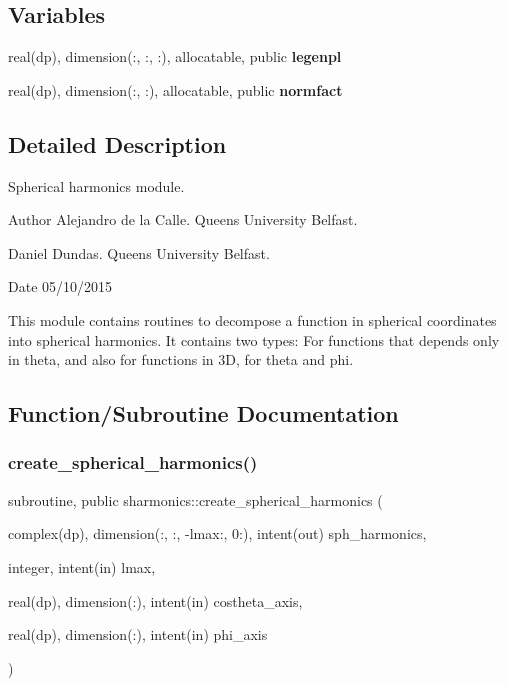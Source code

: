 \subsection*{Variables}
\begin{DoxyCompactItemize}
\item 
\mbox{\label{namespacesharmonics_a54e2870724fae4c7a6ac8dc4b971a993}} 
real(dp), dimension(\+:, \+:, \+:), allocatable, public {\bfseries legenpl}
\item 
\mbox{\label{namespacesharmonics_a9cfef04ded9db9a5fd116ec10af39b43}} 
real(dp), dimension(\+:, \+:), allocatable, public {\bfseries normfact}
\end{DoxyCompactItemize}


\subsection{Detailed Description}
Spherical harmonics module. 

\begin{DoxyAuthor}{Author}
Alejandro de la Calle. Queen\textquotesingle{}s University Belfast. 

Daniel Dundas. Queen\textquotesingle{}s University Belfast. 
\end{DoxyAuthor}
\begin{DoxyDate}{Date}
05/10/2015
\end{DoxyDate}
This module contains routines to decompose a function in spherical coordinates into spherical harmonics. It contains two types\+: For functions that depends only in theta, and also for functions in 3D, for theta and phi. 

\subsection{Function/\+Subroutine Documentation}
\mbox{\label{namespacesharmonics_a1b0768c031d59eb8ff3c10e5173e995b}} 
\subsubsection{\texorpdfstring{create\+\_\+spherical\+\_\+harmonics()}{create\_spherical\_harmonics()}}
{\footnotesize\ttfamily subroutine, public sharmonics\+::create\+\_\+spherical\+\_\+harmonics (\begin{DoxyParamCaption}\item[{complex(dp), dimension(\+:, \+:, -\/lmax\+:, 0\+:), intent(out)}]{sph\+\_\+harmonics,  }\item[{integer, intent(in)}]{lmax,  }\item[{real(dp), dimension(\+:), intent(in)}]{costheta\+\_\+axis,  }\item[{real(dp), dimension(\+:), intent(in)}]{phi\+\_\+axis }\end{DoxyParamCaption})}



